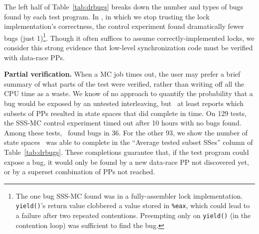 The left half of Table~\ref{tab:drbugs}
breaks down the number and types of bugs found by each test program.
In \mxtest, in which we stop trusting the lock implementation's correctness,
the control experiment found dramatically fewer bugs (just 1)\footnote{
	The one bug SSS-MC found was in a fully-assembler lock implementation. {\tt yield()}'s return value clobbered a value stored in {\tt \%eax}, which could lead to a failure after two repeated contentions. Preempting only on {\tt yield()} (in the contention loop) was sufficient to find the bug.}.
Though it often suffices to assume correctly-implemented locks,
we consider this strong evidence that low-level synchronization code must be verified with data-race PPs.

{\bf Partial verification.}
When a MC job times out, the user may prefer a brief summary of what parts of the test were verified, rather than writing off all the CPU time as a waste.
We know of no approach to quantify the probability
that a bug would be exposed by an untested interleaving,
but \quicksand~at least reports which subsets of PPs resulted in state spaces that did complete in time.
On 129 tests, the SSS-MC control experiment timed out after 10 hours with no bugs found.
Among these tests, \quicksand~found bugs in 36.
For the other 93, we show the number of state spaces \quicksand~was able to complete in the ``Average tested subset SSes'' column of Table~\ref{tab:drbugs}.
These completions guarantee that, if the test program could expose a bug,
it would only be found by a new data-race PP not discovered yet, or by a superset combination of PPs not reached.

